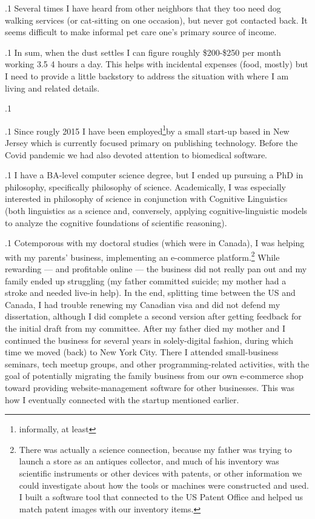 \documentclass[11pt, twoside]{article}
\begin{document}
{\p.1{%
Several times I have heard from other neighbors that they
too need dog walking services (or cat-sitting on one occasion),
but never got contacted back. It seems difficult to make informal
pet care one's primary source of income.
}%

\p.1{%
In sum, when the dust settles I can figure roughly \$200-\$250 per month working
3.5 \ndash{} 4 hours a day. This helps with incidental
expenses (food, mostly) but I need to provide a little
backstory to address the situation with where I am living and related details.
}%

\p.1{%
\ghrule{}
}%

\p.1{%
Since rougly 2015 I have been employed\footnote{informally, at least}\hspace{3pt}by a
small start-up based in New Jersey which is currently focused
primary on publishing technology. Before the Covid pandemic we
had also devoted attention to biomedical software.
}%

\p.1{%
I have a BA-level computer science degree, but I ended up
pursuing a PhD in philosophy, specifically philosophy of science.
Academically, I was especially interested in philosophy of science
in conjunction with Cognitive Linguistics (both linguistics as a science and,
conversely, applying cognitive-linguistic models to analyze
the cognitive foundations of scientific reasoning).
}%

\p.1{%
Cotemporous with my doctoral studies (which were in Canada), I
was helping with my parents' business, implementing an e-commerce
platform.\footnote{There was actually a science connection, because my
father was trying to launch a store as an antiques collector, and
much of his inventory was scientific instruments or other devices
with patents, or other information we could investigate about how the tools
or machines were constructed and used. I built a software tool
that connected to the US Patent Office and helped us match patent
images with our inventory items.}  While rewarding --- and
profitable online --- the  business did
not really pan out and my family ended up struggling (my father
committed suicide; my mother had a stroke and needed live-in help).
In the end, splitting time between the US and Canada, I had trouble
renewing my Canadian visa and did not defend my dissertation, although
I did complete a second version after getting feedback for the
initial draft from my committee. After my father died my mother and I continued the
business for several years in solely-digital fashion, during which time
we moved (back) to New York City. There I attended small-business seminars,
tech meetup groups, and other programming-related activities, with the
goal of potentially migrating the family business from our own e-commerce
shop toward providing website-management software for other businesses.
This was how I eventually connected with the startup mentioned earlier.
}%

}
\end{document}
